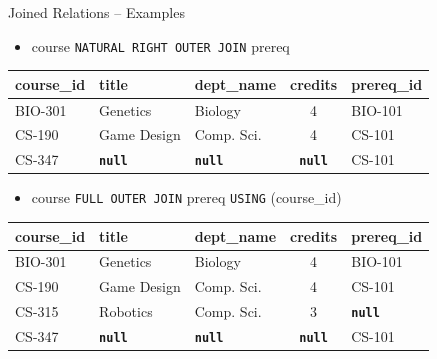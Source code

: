 \documentclass{beamer}
\begin{document}
\begin{frame}{Joined Relations – Examples}
    \begin{itemize}
        \item course \texttt{NATURAL RIGHT OUTER JOIN} prereq
    \end{itemize}
    \scriptsize
    \begin{tabular}{| l | l | l | c | l |}
        \hline
        \textbf{course\_id} & \textbf{title} & \textbf{dept\_name} & \textbf{credits} & \textbf{prereq\_id} \\
        \hline
        BIO-301 & Genetics    & Biology    & 4 & BIO-101 \\
        \hline
        CS-190  & Game Design & Comp. Sci. & 4 & CS-101  \\
        \hline
        CS-347  & \textbf{\texttt{null}}   & \textbf{\texttt{null}} & \textbf{\texttt{null}} & CS-101 \\
        \hline
    \end{tabular}
    \vspace{5mm}
    \normalsize
    \begin{itemize}
        \item course \texttt{FULL OUTER JOIN} prereq \texttt{USING} (course\_id)
    \end{itemize}
    \scriptsize
    \begin{tabular}{| l | l | l | c | l |}
        \hline
        \textbf{course\_id} & \textbf{title} & \textbf{dept\_name} & \textbf{credits} & \textbf{prereq\_id} \\
        \hline
        BIO-301 & Genetics    & Biology    & 4 & BIO-101 \\
        \hline
        CS-190  & Game Design & Comp. Sci. & 4 & CS-101  \\
        \hline
        CS-315  & Robotics    & Comp. Sci. & 3 & \textbf{\texttt{null}}\\
        \hline
        CS-347  & \textbf{\texttt{null}}   & \textbf{\texttt{null}} & \textbf{\texttt{null}} & CS-101 \\
        \hline
    \end{tabular}
\end{frame}
\end{document}
